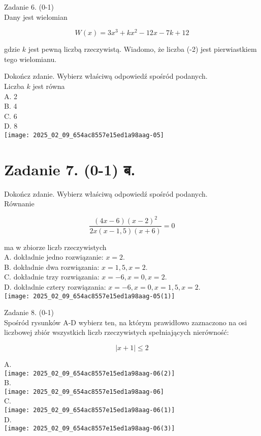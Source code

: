 \documentclass[10pt]{article}
\begin{document}
Zadanie 6. (0-1)\\
Dany jest wielomian

\[
W(x)=3 x^{3}+k x^{2}-12 x-7 k+12
\]

gdzie \(k\) jest pewną liczbą rzeczywistą. Wiadomo, że liczba (-2) jest pierwiastkiem tego wielomianu.

Dokończ zdanie. Wybierz właściwą odpowiedź spośród podanych.\\
Liczba \(k\) jest równa\\
A. 2\\
B. 4\\
C. 6\\
D. 8\\
\texttt{[image: 2025\_02\_09\_654ac8557e15ed1a98aag-05]}

\section*{Zadanie 7. (0-1) ब.}
Dokończ zdanie. Wybierz właściwą odpowiedź spośród podanych.\\
Równanie

\[
\frac{(4 x-6)(x-2)^{2}}{2 x(x-1,5)(x+6)}=0
\]

ma w zbiorze liczb rzeczywistych\\
A. dokładnie jedno rozwiązanie: \(x=2\).\\
B. dokładnie dwa rozwiązania: \(x=1,5, x=2\).\\
C. dokładnie trzy rozwiązania: \(x=-6, x=0, x=2\).\\
D. dokładnie cztery rozwiązania: \(x=-6, x=0, x=1,5, x=2\).\\
\texttt{[image: 2025\_02\_09\_654ac8557e15ed1a98aag-05(1)]}

Zadanie 8. (0-1)\\
Spośród rysunków A-D wybierz ten, na którym prawidłowo zaznaczono na osi liczbowej zbiór wszystkich liczb rzeczywistych spełniających nierówność:

\[
|x+1| \leq 2
\]

A.\\
\texttt{[image: 2025\_02\_09\_654ac8557e15ed1a98aag-06(2)]}\\
B.\\
\texttt{[image: 2025\_02\_09\_654ac8557e15ed1a98aag-06]}\\
C.\\
\texttt{[image: 2025\_02\_09\_654ac8557e15ed1a98aag-06(1)]}\\
D.\\
\texttt{[image: 2025\_02\_09\_654ac8557e15ed1a98aag-06(3)]}
\end{document}
